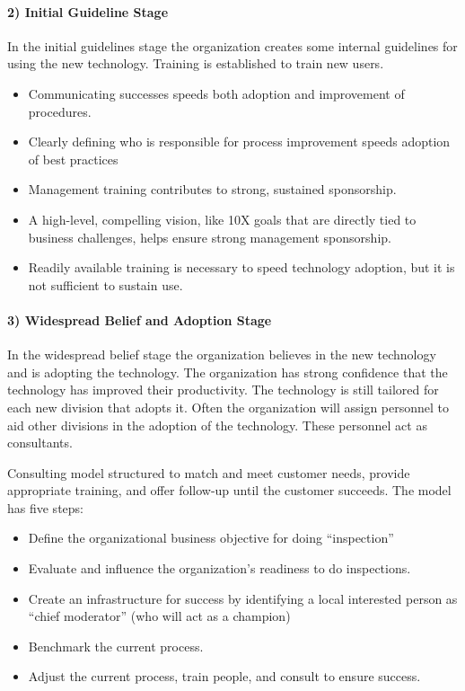 \paragraph{2) Initial Guideline Stage}
In the initial guidelines stage the organization creates some internal
guidelines for using the new technology.  Training is established to train
new users.  
\begin{itemize}
\item{Communicating successes speeds both adoption and improvement of
procedures.}
\item{Clearly defining who is responsible for process improvement speeds
adoption of best practices}
\item{Management training contributes to strong, sustained sponsorship.}
\item{A high-level, compelling vision, like 10X goals that are directly
tied to business challenges, helps ensure strong management sponsorship.}
\item{Readily available training is necessary to speed technology adoption,
but it is not sufficient to sustain use.}
\end{itemize}

\paragraph{3) Widespread Belief and Adoption Stage}
In the widespread belief stage the organization believes in the new
technology and is adopting the technology.  The organization has strong
confidence that the technology has improved their productivity.  The
technology is still tailored for each new division that adopts it.  Often
the organization will assign personnel to aid other divisions in the
adoption of the technology.  These personnel act as consultants.  

Consulting model structured to match and meet customer needs, provide
appropriate training, and offer follow-up until the customer succeeds.  The
model has five steps:
\begin{itemize}
\item{Define the organizational business objective for doing
``inspection''}
\item{Evaluate and influence the organization's readiness to do
inspections.}
\item{Create an infrastructure for success by identifying a local
interested person as ``chief moderator'' (who will act as a champion)}
\item{Benchmark the current process.}
\item{Adjust the current process, train people, and consult to ensure
success.}
\end{itemize}


